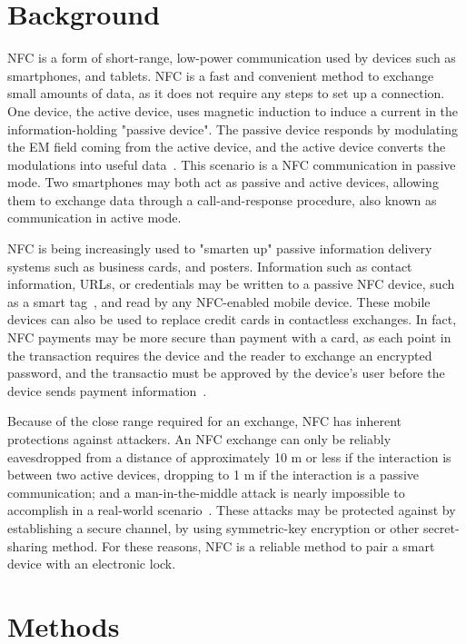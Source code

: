 \documentclass{article}
\begin{document}
\section{Background}

NFC is a form of short-range, low-power communication used by devices such as smartphones, and tablets. NFC is a fast
and convenient method to exchange small amounts of data, as it does not require any steps to set up a connection. One
device, the active device, uses magnetic induction to induce a current in the information-holding "passive device". The
passive device responds by modulating the EM field coming from the active device, and the active device converts the
modulations into useful data~\autocite{NFCORG}. This scenario is a NFC communication in passive mode. Two smartphones
may both act as passive and active devices, allowing them to exchange data through a call-and-response procedure, also
known as communication in active mode.

NFC is being increasingly used to "smarten up" passive information delivery systems such as business cards, and posters.
Information such as contact information, URLs, or credentials may be written to a passive NFC device, such as a smart
tag~\autocite{NFCFORUMWHATIS}, and read by any NFC-enabled mobile device. These mobile devices can also be used to
replace credit cards in contactless exchanges. In fact, NFC payments may be more secure than payment with a card, as
each point in the transaction requires the device and the reader to exchange an encrypted password, and the transactio
 must be approved by the device's user before the device sends payment information~\autocite{NFCPAYMENT}.

Because of the close range required for an exchange, NFC has inherent protections against attackers. An NFC exchange
can only be reliably eavesdropped from a distance of approximately 10 m or less if the interaction is between two active
devices, dropping to 1 m if the interaction is a passive communication; and a man-in-the-middle attack is nearly
impossible to accomplish in a real-world scenario~\autocite{NFCSECURITY}. These attacks may be protected against by
establishing a secure channel, by using symmetric-key encryption or other secret-sharing method. For these reasons,
NFC is a reliable method to pair a smart device with an electronic lock.

\section{Methods}
\end{document}
